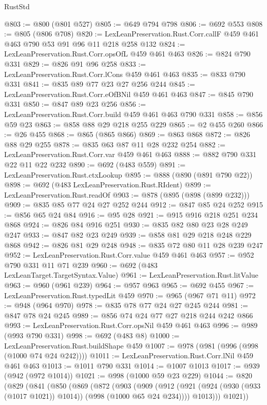\begin{lexlean}{RustStd}
\begin{coremodule}
@803 := @800 (@801 @527)
@805 := @649 @794 @798
@806 := @692 @553
@808 := @805 (@806 @708)
@820 := LexLeanPreservation.Rust.Corr.callF @459 @461 @463 @790 @53 @91 @96 @11 @218 @258 @132
@824 := LexLeanPreservation.Rust.Corr.opsOfL @459 @461 @463
@826 := @824 @790 @331
@829 := @826 @91 @96 @258
@833 := LexLeanPreservation.Rust.Corr.lCons @459 @461 @463
@835 := @833 @790 @331
@841 := @835 @89 @77 @23 @27 @256 @244
@845 := LexLeanPreservation.Rust.Corr.eOfBNil @459 @461 @463
@847 := @845 @790 @331
@850 := @847 @89 @23 @256
@856 := LexLeanPreservation.Rust.Corr.build @459 @461 @463 @790 @331
@858 := @856 @59 @23
@863 := @858 @88 @29 @218 @255 @229
@865 := @2 @455 @260
@866 := @26 @455
@868 := @865 (@865 @866)
@869 := @863 @868
@872 := @826 @88 @29 @255
@878 := @835 @63 @87 @11 @28 @232 @254
@882 := LexLeanPreservation.Rust.Corr.var @459 @461 @463
@888 := @882 @790 @331 @22 @11 @22 @232
@890 := @692 (@483 @559)
@891 := LexLeanPreservation.Rust.ctxLookup
@895 := @888 (@890 (@891 @790 @22))
@898 := @692 (@483 LexLeanPreservation.Rust.RIdent)
@899 := LexLeanPreservation.Rust.readOf
@903 := @878 (@895 (@898 (@899 @232)))
@909 := @835 @85 @77 @24 @27 @252 @244
@912 := @847 @85 @24 @252
@915 := @856 @65 @24 @84
@916 := @95 @28
@921 := @915 @916 @218 @251 @234 @868
@924 := @826 @84 @916 @251
@930 := @835 @82 @80 @23 @28 @249 @247
@933 := @847 @82 @23 @249
@939 := @858 @81 @29 @218 @248 @229 @868
@942 := @826 @81 @29 @248
@948 := @835 @72 @80 @11 @28 @239 @247
@952 := LexLeanPreservation.Rust.Corr.value @459 @461 @463
@957 := @952 @790 @331 @11 @71 @239
@960 := @692 (@483 LexLeanTarget.TargetSyntax.Value)
@961 := LexLeanPreservation.Rust.litValue
@963 := @960 (@961 @239)
@964 := @957 @963
@965 := @692 @455
@967 := LexLeanPreservation.Rust.typedLit @459
@970 := @965 (@967 @71 @11)
@972 := @948 (@964 @970)
@978 := @835 @78 @77 @24 @27 @245 @244
@981 := @847 @78 @24 @245
@989 := @856 @74 @24 @77 @27 @218 @244 @242 @866
@993 := LexLeanPreservation.Rust.Corr.opsNil @459 @461 @463
@996 := @989 (@993 @790 @331)
@998 := @692 (@483 @8)
@1000 := LexLeanPreservation.Rust.buildShape @459
@1007 := @978 (@981 (@996 (@998 (@1000 @74 @24 @242))))
@1011 := LexLeanPreservation.Rust.Corr.lNil @459 @461 @463
@1013 := @1011 @790 @331
@1014 := @1007 @1013
@1017 := @939 (@942 (@972 @1014))
@1021 := @998 (@1000 @59 @23 @229)
@1044 := @820
    (@829
      (@841
        (@850
          (@869
            (@872
              (@903
                (@909
                  (@912 (@921 (@924 (@930 (@933 (@1017 @1021)) @1014)) (@998 (@1000 @65 @24 @234))))
                  @1013)))
            @1021))

\end{coremodule}
\end{lexlean}
